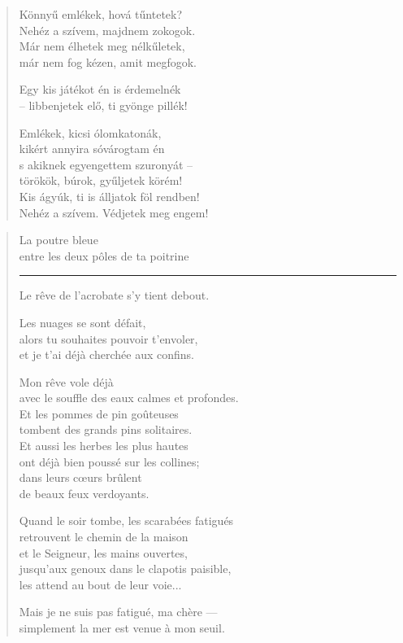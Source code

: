 \documentclass[11pt]{book}
\newcommand*{\centeredornament}{\centerline{\pgfornament[width=6cm]{88}}}
\begin{document}


\begin{verse}
  Könnyű emlékek, hová tűntetek? \\
  Nehéz a szívem, majdnem zokogok. \\
  Már nem élhetek meg nélkűletek, \\
  már nem fog kézen, amit megfogok.

  Egy kis játékot én is érdemelnék \\
  -- libbenjetek elő, ti gyönge pillék!

  Emlékek, kicsi ólomkatonák, \\
  kikért annyira sóvárogtam én \\
  s akiknek egyengettem szuronyát -- \\
  törökök, búrok, gyűljetek körém! \\
  Kis ágyúk, ti is álljatok föl rendben! \\
  Nehéz a szívem. Védjetek meg engem!
\end{verse}

\newpage

\vspace*{-15mm}
\centeredornament



\begin{verse}
  La poutre bleue \\
  entre les deux pôles de ta poitrine \\
  \rule[0.2em]{3em}{0.5pt} Le rêve de l'acrobate s'y tient debout.\hspace*{-1mm}

  Les nuages se sont défait, \\
  alors tu souhaites pouvoir t'envoler, \\
  et je t'ai déjà cherchée aux confins.

  Mon rêve vole déjà \\
  avec le souffle des eaux calmes et profondes. \\
  Et les pommes de pin goûteuses \\
  tombent des grands pins solitaires. \\
  Et aussi les herbes les plus hautes \\
  ont déjà bien poussé sur les collines; \\
  dans leurs cœurs brûlent \\
  de beaux feux verdoyants.

  Quand le soir tombe, les scarabées fatigués \\
  retrouvent le chemin de la maison \\
  et le Seigneur, les mains ouvertes, \\
  jusqu'aux genoux dans le clapotis paisible, \\
  les attend au bout de leur voie...

  Mais je ne suis pas fatigué, ma chère --- \\
  simplement la mer est venue à mon seuil.
\end{verse}
\end{document}
